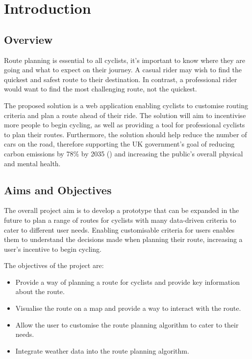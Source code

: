 \chapter{Introduction}
\label{chap:intro}

\section{Overview}
\label{intro:overview}

Route planning is essential to all cyclists, it's important to know where they are going and what to expect on their journey. A casual rider may wish to find the quickest and safest route to their destination. In contrast, a professional rider would want to find the most challenging route, not the quickest.

The proposed solution is a web application enabling cyclists to customise routing criteria and plan a route ahead of their ride. The solution will aim to incentivise more people to begin cycling, as well as providing a tool for professional cyclists to plan their routes. Furthermore, the solution should help reduce the number of cars on the road, therefore supporting the UK government's goal of reducing carbon emissions by 78\% by 2035 (\cite{govuk_net_2022}) and increasing the public's overall physical and mental health.

\section{Aims and Objectives}
\label{intro:aimsandobjectives}

The overall project aim is to develop a prototype that can be expanded in the future to plan a range of routes for cyclists with many data-driven criteria to cater to different user needs. Enabling customisable criteria for users enables them to understand the decisions made when planning their route, increasing a user's incentive to begin cycling.
 
The objectives of the project are:
\begin{itemize}
    \item Provide a way of planning a route for cyclists and provide key information about the route.
    \item Visualise the route on a map and provide a way to interact with the route.
    \item Allow the user to customise the route planning algorithm to cater to their needs.
    \item Integrate weather data into the route planning algorithm.
\end{itemize}

